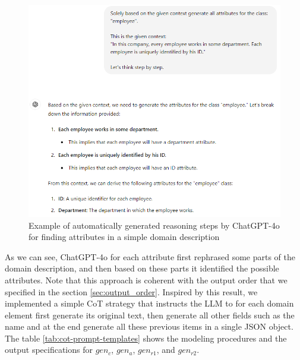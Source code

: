 \begin{figure}[!h]
    \centering
    \includegraphics[scale=0.6]{img/cot-think-step-by-step.png}
    \caption{\centering Example of automatically generated reasoning steps by ChatGPT-4o for finding attributes in a simple domain description}
    \label{fig:cot-think-step-by-step}
\end{figure}

As we can see, ChatGPT-4o for each attribute first rephrased some parts of the domain description, and then based on these parts it identified the possible attributes. Note that this approach is coherent with the output order that we specified in the section \ref{sec:output_order}. Inspired by this result, we implemented a simple CoT strategy that instructs the LLM to for each domain element first generate its original text, then generate all other fields such as the name and at the end generate all these previous items in a single JSON object. The table \ref{tab:cot-prompt-templates} shows the modeling procedures and the output specifications for $gen_c$, $gen_a$, $gen_{r1}$, and $gen_{r2}$.


